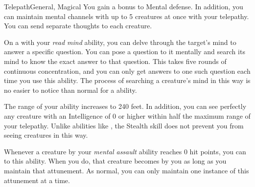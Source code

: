 \begin{feat}{Telepath}{General, Magical}
         You gain a  bonus to Mental defense.
        In addition, you can maintain mental channels with up to 5 creatures at once with your telepathy.
        You can send separate thoughts to each creature.

         On a  with your \textit{read mind} ability, you can delve through the target's mind to answer a specific question.
        You can pose a question to it mentally and search its mind to know the exact answer to that question.
        This takes five rounds of continuous concentration, and you can only get answers to one such question each time you use this ability.
        The process of searching a creature's mind in this way is no easier to notice than normal for a  ability.

         The range of your  ability increases to 240 feet.
        In addition, you can see perfectly any creature with an Intelligence of 0 or higher within half the maximum range of your telepathy.
        Unlike abilities like , the Stealth skill does not prevent you from seeing creatures in this way.

         Whenever a creature \stunned by your \textit{mental assault} ability reaches 0 hit points, you can  to this ability.
        When you do, that creature becomes \dominated by you as long as you maintain that attunement.
        As normal, you can only maintain one instance of this attunement at a time.
    \end{feat}

